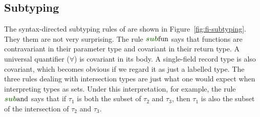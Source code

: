 \subsection{Subtyping}

\begin{comment}
In some calculi, the subtyping relation is external to the language: those
calculi are indifferent to how the subtyping relation is defined. In \name, we
take a syntatic approach, that is, subtyping is due to the syntax of types.
However, this approach does not preclude integrating other forms of subtyping
into our system. One is ``primitive'' subtyping relations such as natural
numbers being a subtype of integers. The other is nominal subtyping relations
that are explicitly declared by the programmer.
\end{comment}

\begin{figure*}
  \small
  
  \caption{Subtyping in \name.}
  \label{fig:fi-subtyping}
\end{figure*}

The syntax-directed subtyping rules of \name are shown in Figure~\ref{fig:fi-subtyping}. They them
are not very surprising. The rule $\rulelabelsubfun$ says that functions are
contravariant in their parameter type and covariant in their return type. A
universal quantifier ($\forall$) is covariant in its body. A single-field record
type is also covariant, which becomes obvious if we regard it as just a labelled
type. The three rules dealing with intersection types are just what one would
expect when interpreting types as sets. Under this interpretation, for example,
the rule $\rulelabelsuband$ says that if $\tau_1$ is both the subset of $\tau_2$
and $\tau_3$, then $\tau_1$ is also the subset of the intersection of $\tau_2$
and $\tau_3$.



